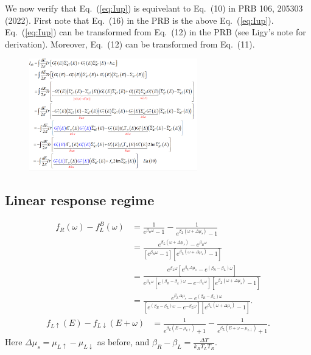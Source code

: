 \documentclass[aps,prb,superscriptaddress]{revtex4-2}
\begin{document}
We now verify that Eq.~(\ref{eq:Iup}) is equivelant to Eq.~(10) in PRB 106, 205303 (2022). First note that Eq.~(16) in the PRB is the above Eq.~(\ref{eq:Iup}). Eq.~(\ref{eq:Iup}) can be transformed from Eq.~(12) in the PRB (see Ligy's note for derivation). Moreover, Eq.~(12) can be transformed from Eq.~(11).
\begin{figure}[htp!]
\centering
\includegraphics[width=0.65\textwidth, height=0.5\textwidth]{figures/eq1.png}
\end{figure}
\subsection{Linear response regime}
\begin{equation}\label{eq:fupdown0}
\begin{split}
f_{R}(\omega)-f_{L}^{B}(\omega) &= \frac{1}{e^{\beta_{R}\omega}-1} - \frac{1}{e^{\beta_{L}(\omega+\Delta\mu_{s})}-1} \\
&= \frac{e^{\beta_{L}(\omega+\Delta\mu_{s})} - e^{\beta_{R}\omega}}{[e^{\beta_{R}\omega}-1][e^{\beta_{L}(\omega+\Delta\mu_{s})}-1]} \\
&= \frac{e^{\beta_{L}\omega}[e^{\beta_{L}\Delta\mu_{s}} - e^{(\beta_{R}-\beta_{L})\omega}]}{e^{\beta_{L}\omega}[e^{(\beta_{R}-\beta_{L})\omega}-e^{-\beta_{L}\omega}][e^{\beta_{L}(\omega+\Delta\mu_{s})}-1]} \\
&= \frac{e^{\beta_{L}\Delta\mu_{s}} - e^{(\beta_{R}-\beta_{L})\omega}}{[e^{(\beta_{R}-\beta_{L})\omega}-e^{-\beta_{L}\omega}][e^{\beta_{L}(\omega+\Delta\mu_{s})}-1]}.
\end{split}
\end{equation}
\begin{equation}
\begin{split}
f_{L\uparrow}(E)-f_{L\downarrow}(E+\omega) &= \frac{1}{e^{\beta_{L}(E-\mu_{L\uparrow})}+1} - \frac{1}{e^{\beta_{L}(E+\omega-\mu_{L\downarrow})}+1}.
\end{split}
\end{equation}
Here $\Delta\mu_{s} = \mu_{L\uparrow} - \mu_{L\downarrow}$ as before, and $\beta_{R}-\beta_L = \frac{\Delta T}{k_{B}T_{L}T_{R}}$. 
\end{document}
